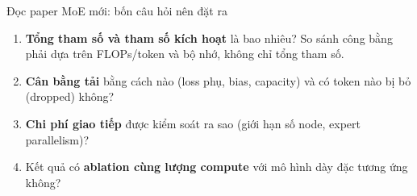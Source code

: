 \begin{keyidea}{Đọc paper MoE mới: bốn câu hỏi nên đặt ra}
\begin{enumerate}
	\item \textbf{Tổng tham số và tham số kích hoạt} là bao nhiêu? So sánh công bằng phải dựa trên FLOPs/token và bộ nhớ, không chỉ tổng tham số.
	\item \textbf{Cân bằng tải} bằng cách nào (loss phụ, bias, capacity) và có token nào bị bỏ (dropped) không?
	\item \textbf{Chi phí giao tiếp} được kiểm soát ra sao (giới hạn số node, expert parallelism)?
	\item Kết quả có \textbf{ablation cùng lượng compute} với mô hình dày đặc tương ứng không?
\end{enumerate}
\end{keyidea}